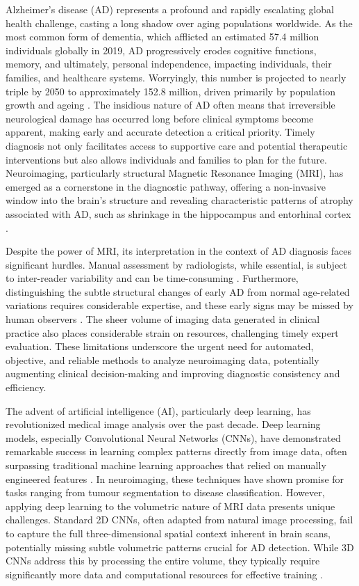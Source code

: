 \documentclass[11pt, a4paper]{article}
\begin{document}
Alzheimer's disease (AD) represents a profound and rapidly escalating global health challenge, casting a long shadow over aging populations worldwide. As the most common form of dementia, which afflicted an estimated 57.4 million individuals globally in 2019, AD progressively erodes cognitive functions, memory, and ultimately, personal independence, impacting individuals, their families, and healthcare systems. Worryingly, this number is projected to nearly triple by 2050 to approximately 152.8 million, driven primarily by population growth and ageing \cite{nichols2022estimation}. The insidious nature of AD often means that irreversible neurological damage has occurred long before clinical symptoms become apparent, making early and accurate detection a critical priority. Timely diagnosis not only facilitates access to supportive care and potential therapeutic interventions but also allows individuals and families to plan for the future. Neuroimaging, particularly structural Magnetic Resonance Imaging (MRI), has emerged as a cornerstone in the diagnostic pathway, offering a non-invasive window into the brain's structure and revealing characteristic patterns of atrophy associated with AD, such as shrinkage in the hippocampus and entorhinal cortex \cite{vemuri2010role, frisoni2010clinical}.

Despite the power of MRI, its interpretation in the context of AD diagnosis faces significant hurdles. Manual assessment by radiologists, while essential, is subject to inter-reader variability and can be time-consuming \cite{cuingnet2011automatic}. Furthermore, distinguishing the subtle structural changes of early AD from normal age-related variations requires considerable expertise, and these early signs may be missed by human observers \cite{kloppel2008accuracy}. The sheer volume of imaging data generated in clinical practice also places considerable strain on resources, challenging timely expert evaluation. These limitations underscore the urgent need for automated, objective, and reliable methods to analyze neuroimaging data, potentially augmenting clinical decision-making and improving diagnostic consistency and efficiency.

The advent of artificial intelligence (AI), particularly deep learning, has revolutionized medical image analysis over the past decade. Deep learning models, especially Convolutional Neural Networks (CNNs), have demonstrated remarkable success in learning complex patterns directly from image data, often surpassing traditional machine learning approaches that relied on manually engineered features \cite{litjens2017survey}. In neuroimaging, these techniques have shown promise for tasks ranging from tumour segmentation to disease classification. However, applying deep learning to the volumetric nature of MRI data presents unique challenges. Standard 2D CNNs, often adapted from natural image processing, fail to capture the full three-dimensional spatial context inherent in brain scans, potentially missing subtle volumetric patterns crucial for AD detection. While 3D CNNs address this by processing the entire volume, they typically require significantly more data and computational resources for effective training \cite{yang2021reinventing}.
\end{document}
